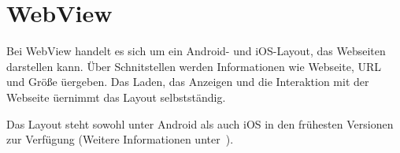 \section{WebView}
Bei WebView handelt es sich um ein Android- und iOS-Layout, das Webseiten darstellen kann. Über Schnitstellen werden
Informationen wie Webseite, URL und Größe üergeben. Das Laden, das Anzeigen und die Interaktion mit der Webseite üernimmt
das Layout selbstständig.

Das Layout steht sowohl unter Android als auch iOS in den frühesten Versionen zur Verfügung (Weitere Informationen
unter~\cite{online_grundlagen_webview}).